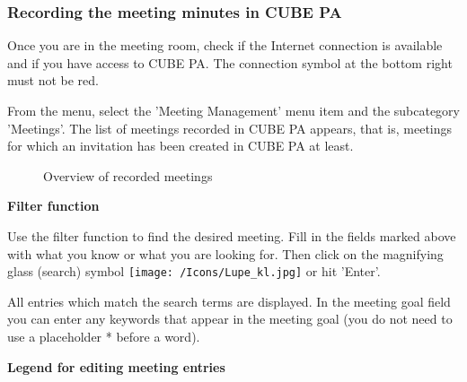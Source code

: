 \subsubsection{Recording the meeting minutes in CUBE PA}

Once you are in the meeting room, check if the Internet connection is available and if you have access to CUBE PA. The connection symbol at the bottom right must not be red.

\vspace{\baselineskip}

From the menu, select the 'Meeting Management' menu item and the subcategory 'Meetings'. The list of meetings recorded in CUBE PA appears, that is, meetings for which an invitation has been created in CUBE PA at least. 

\begin{figure}[H]
\caption{Overview of recorded meetings}
\end{figure}

\textbf{Filter function}

Use the filter function to find the desired meeting. Fill in the fields marked above with what you know or what you are looking for. Then click on the magnifying glass (search) symbol \texttt{[image: /Icons/Lupe\_kl.jpg]} or hit 'Enter'.

\vspace{\baselineskip}

All entries which match the search terms are displayed. In the meeting goal field you can enter any keywords that appear in the meeting goal (you do not need to use a placeholder * before a word).

\vspace{\baselineskip}

\textbf{Legend for editing meeting entries}

\vspace{\baselineskip}

